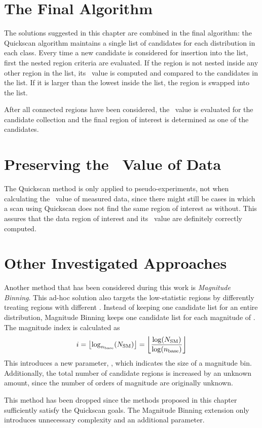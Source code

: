\section{The Final Algorithm}
The solutions suggested in this chapter are combined in the final algorithm: the Quickscan algorithm maintains a single list of \paramregions candidates for each distribution in each class. Every time a new candidate is considered for insertion into the list, first the nested region criteria are evaluated. If the region is not nested inside any other region in the list, its \mychi~value is computed and compared to the candidates in the list. If it is larger than the lowest \mychi inside the list, the region is swapped into the list.

After all connected regions have been considered, the \p~value is evaluated for the candidate collection and the final region of interest is determined as one of the candidates. 

\section{Preserving the \p~Value of Data}
The Quickscan method is only applied to pseudo-experiments, not when calculating the \p~value of measured data, since there might still be cases in which a scan using Quickscan does not find the same region of interest as without. This assures that the data region of interest and its \p~value are definitely correctly computed.

\section{Other Investigated Approaches}
Another method that has been considered during this work is \emph{Magnitude Binning}. This ad-hoc solution also targets the low-statistic regions by differently treating regions with different \Nmc. Instead of keeping one candidate list for an entire distribution, Magnitude Binning keeps one candidate list for each magnitude of \Nmc. The magnitude index is calculated as
\begin{equation}
i = \left\lfloor\log_{n_\mathrm{base}}({N_\mathrm{SM}})\right\rfloor = \left\lfloor\frac{\log({N_\mathrm{SM}})}{\log({n_\mathrm{base}})}\right\rfloor
\end{equation}
This introduces a new parameter, \parambinbase, which indicates the size of a magnitude bin. Additionally, the total number of candidate regions is increased by an unknown amount, since the number of orders of magnitude are originally unknown.

This method has been dropped since the methods proposed in this chapter sufficiently satisfy the Quickscan goals. The Magnitude Binning extension only introduces unnecessary complexity and an additional parameter.

